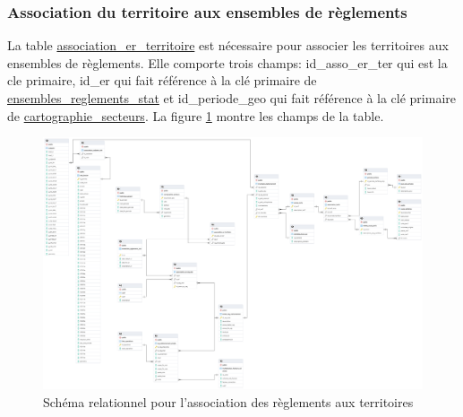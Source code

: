     \subsubsection{Association du territoire aux ensembles de règlements}
    La table \underline{association\_er\_territoire} est nécessaire pour associer les territoires aux ensembles de règlements. Elle comporte trois champs: id\_asso\_er\_ter qui est la cle primaire, id\_er qui fait référence à la clé primaire de \underline{ensembles\_reglements\_stat} et id\_periode\_geo qui fait référence à la clé primaire de \underline{cartographie\_secteurs}. La figure \ref{fig:offstreet_db_erd_er_ter} montre les champs de la table.
    \begin{figure}[h]
        \centering
        \includegraphics[trim={15cm 37.5cm 55cm 25cm},clip,width=12.5cm]{images/structure_base_de_donnee.png}
        \caption{Schéma relationnel pour l'association des règlements aux territoires}
        \label{fig:offstreet_db_erd_er_ter}
    \end{figure}
    \FloatBarrier

